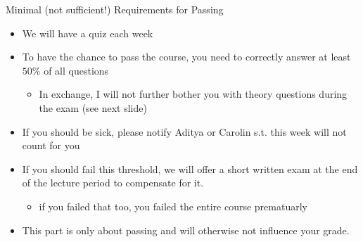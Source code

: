 \documentclass[aspectratio=169, handout]{../latex_main/tntbeamer}  %
\begin{document}
\begin{frame}[c]{Minimal (not sufficient!) Requirements for Passing}

\begin{itemize}
  \item We will have a quiz each week
  \item To have the chance to pass the course, you need to correctly answer at least $50\%$ of all questions
  \begin{itemize}
      \item In exchange, I will not further bother you with theory questions during the exam (see next slide)
  \end{itemize}
  \item If you should be sick, please notify Aditya or Carolin s.t. this week will not count for you
  \item If you should fail this threshold, we will offer a short written exam at the end of the lecture period to compensate for it.
    \begin{itemize}
        \item if you failed that too, you failed the entire course prematuarly
    \end{itemize}
  \item This part is only about passing and will otherwise not influence your grade.
\end{itemize}

\end{frame}
\end{document}
